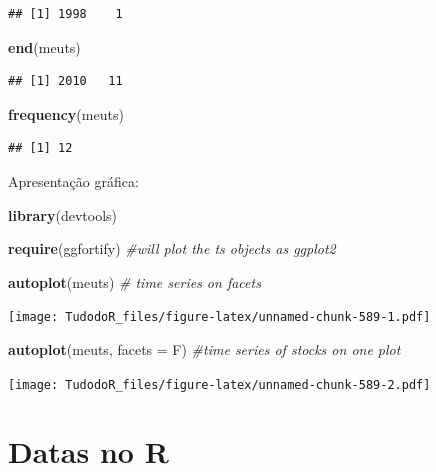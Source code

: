 \documentclass[
]{book}
\newenvironment{Shaded}{\begin{snugshade}}{\end{snugshade}}
\newcommand{\CommentTok}[1]{\textcolor[rgb]{0.56,0.35,0.01}{\textit{#1}}}
\newcommand{\DataTypeTok}[1]{\textcolor[rgb]{0.13,0.29,0.53}{#1}}
\newcommand{\KeywordTok}[1]{\textcolor[rgb]{0.13,0.29,0.53}{\textbf{#1}}}
\newcommand{\NormalTok}[1]{#1}
\begin{document}
\begin{verbatim}
## [1] 1998    1
\end{verbatim}

\begin{Shaded}
\begin{Highlighting}[]
\KeywordTok{end}\NormalTok{(meuts)}
\end{Highlighting}
\end{Shaded}

\begin{verbatim}
## [1] 2010   11
\end{verbatim}

\begin{Shaded}
\begin{Highlighting}[]
\KeywordTok{frequency}\NormalTok{(meuts)}
\end{Highlighting}
\end{Shaded}

\begin{verbatim}
## [1] 12
\end{verbatim}

Apresentação gráfica:

\begin{Shaded}
\begin{Highlighting}[]
\KeywordTok{library}\NormalTok{(devtools)}

\KeywordTok{require}\NormalTok{(ggfortify) }\CommentTok{#will plot the ts objects as ggplot2}

\KeywordTok{autoplot}\NormalTok{(meuts) }\CommentTok{# time series on facets}
\end{Highlighting}
\end{Shaded}

\texttt{[image: TudodoR\_files/figure-latex/unnamed-chunk-589-1.pdf]}

\begin{Shaded}
\begin{Highlighting}[]
\KeywordTok{autoplot}\NormalTok{(meuts, }\DataTypeTok{facets =}\NormalTok{ F) }\CommentTok{#time series of stocks on one plot}
\end{Highlighting}
\end{Shaded}

\texttt{[image: TudodoR\_files/figure-latex/unnamed-chunk-589-2.pdf]}

\hypertarget{datas-no-r}{%
\section{Datas no R}\label{datas-no-r}}
\end{document}
